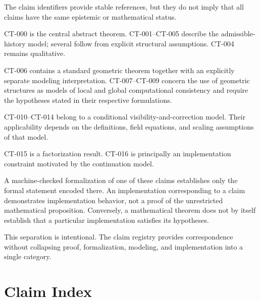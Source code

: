 \documentclass[11pt]{article}
\theoremstyle{definition}
\theoremstyle{remark}
\begin{document}
The claim identifiers provide stable references, but they do not imply that
all claims have the same epistemic or mathematical status.

CT-000 is the central abstract theorem. CT-001--CT-005 describe the
admissible-history model; several follow from explicit structural assumptions.
CT-004 remains qualitative.

CT-006 contains a standard geometric theorem together with an explicitly
separate modeling interpretation. CT-007--CT-009 concern the use of geometric
structures as models of local and global computational consistency and require
the hypotheses stated in their respective formulations.

CT-010--CT-014 belong to a conditional visibility-and-correction model. Their
applicability depends on the definitions, field equations, and scaling
assumptions of that model.

CT-015 is a factorization result. CT-016 is principally an implementation
constraint motivated by the continuation model.

A machine-checked formalization of one of these claims establishes only the
formal statement encoded there. An implementation corresponding to a claim
demonstrates implementation behavior, not a proof of the unrestricted
mathematical proposition. Conversely, a mathematical theorem does not by
itself establish that a particular implementation satisfies its hypotheses.

This separation is intentional. The claim registry provides correspondence
without collapsing proof, formalization, modeling, and implementation into a
single category.

\section*{Claim Index}
\end{document}
